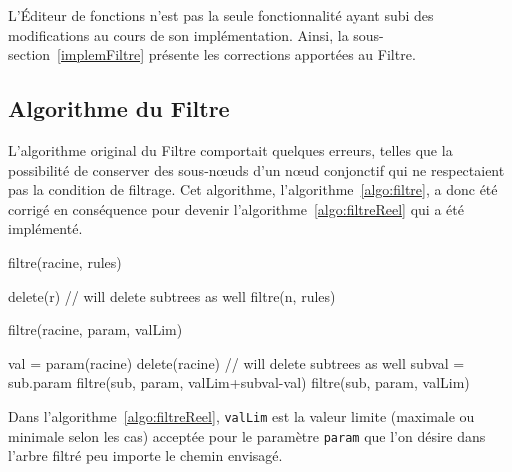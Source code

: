     L'Éditeur de fonctions n'est pas la seule fonctionnalité ayant subi des modifications au cours de son implémentation. Ainsi, la {\sc sous-section}~\ref{implemFiltre} présente les corrections apportées au Filtre.

\subsection{Algorithme du Filtre}
\label{ssec:implemFiltre}

L'algorithme original du Filtre comportait quelques erreurs, telles que la possibilité de conserver des sous-n\oe{}uds d'un n\oe{}ud conjonctif qui ne respectaient pas la condition de filtrage. Cet algorithme, l'{\sc algorithme}~\ref{algo:filtre}, a donc été corrigé en conséquence pour devenir l'{\sc algorithme}~\ref{algo:filtreReel} qui a été implémenté.

 	\begin{algorithm}[H]
            \caption{filtre(racine, rules)}
            \label{algo:filtre}
            \begin{algorithmic}
                        \STATE delete(r) // will delete subtrees as well
                        \RETURN
                    \ENDIF
                \ENDFOR
                \STATE
                    \STATE filtre(n, rules)
                \ENDFOR
            \end{algorithmic}
        \end{algorithm}
        

 	\begin{algorithm}[H]
            \caption{filtre(racine, param, valLim)}
            \label{algo:filtreReel}
            \begin{algorithmic}
	\STATE val = param(racine)
	\STATE
		\STATE delete(racine) // will delete subtrees as well
		\RETURN
	\STATE
	\ELSE
				\STATE subval = sub.param
				\STATE filtre(sub, param, valLim+subval-val)
			\ENDFOR
		\ELSE
				\STATE filtre(sub, param, valLim)
			\ENDFOR
		\ENDIF
	\ENDIF
            \end{algorithmic}
        \end{algorithm}

    Dans l'{\sc algorithme}~\ref{algo:filtreReel}, \verb|valLim| est la valeur limite (maximale ou minimale selon les cas) acceptée pour le paramètre \verb|param| que l'on désire dans l'arbre filtré peu importe le chemin envisagé.


